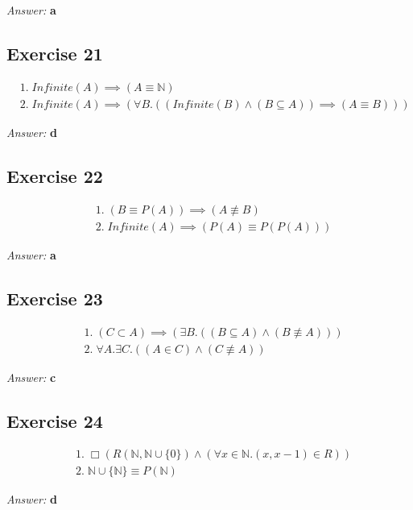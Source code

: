 \documentclass[11pt]{article}
\begin{document}
\emph{Answer:} \textbf{a}
\subsection{Exercise 21}
\label{sec-2-21}
\begin{equation}
\begin{split}
& 1.\; Infinite(A) \implies (A \equiv \mathbb{N}) \\
& 2.\; Infinite(A) \implies (\forall B. ((Infinite(B) \land (B \subseteq A)) \implies (A \equiv B)))
\end{split}
\end{equation}

\emph{Answer:} \textbf{d}
\subsection{Exercise 22}
\label{sec-2-22}
\begin{equation}
\begin{split}
& 1.\; (B \equiv P(A)) \implies (A \not \equiv B) \\
& 2.\; Infinite(A) \implies (P(A) \equiv P(P(A)))
\end{split}
\end{equation}

\emph{Answer:} \textbf{a}
\subsection{Exercise 23}
\label{sec-2-23}
\begin{equation}
\begin{split}
& 1.\; (C \subset A) \implies (\exists B. ((B \subseteq A) \land (B \not \equiv A))) \\
& 2.\; \forall A. \exists C. ((A \in C) \land (C \not \equiv A))
\end{split}
\end{equation}

\emph{Answer:} \textbf{c}
\subsection{Exercise 24}
\label{sec-2-24}
\begin{equation}
\begin{split}
& 1.\; \Box (R(\mathbb{N}, \mathbb{N} \cup \{0\}) \land (\forall x \in \mathbb{N}. (x, x - 1) \in R)) \\
& 2.\; \mathbb{N} \cup \{\mathbb{N}\} \equiv P(\mathbb{N})
\end{split}
\end{equation}

\emph{Answer:} \textbf{d}
\end{document}
